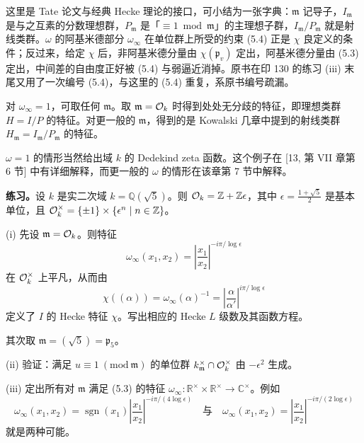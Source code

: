\begin{annote}
这里是 Tate 论文与经典 Hecke 理论的接口，可小结为一张字典：$\mathfrak m$ 记导子，$I_{\mathfrak m}$ 是与之互素的分数理想群，$P_{\mathfrak m}$ 是「$\equiv1\bmod\mathfrak m$」的主理想子群，$I_{\mathfrak m}/P_{\mathfrak m}$ 就是射线类群。$\omega$ 的阿基米德部分 $\omega_\infty$ 在单位群上所受的约束 (5.4) 正是 $\chi$ 良定义的条件；反过来，给定 $\chi$ 后，非阿基米德分量由 $\chi(\mathfrak p_v)$ 定出，阿基米德分量由 (5.3) 定出，中间差的自由度正好被 (5.4) 与弱逼近消掉。原书在印 130 的练习 (iii) 末尾又用了一次编号 (5.4)，与这里的 (5.4) 重复，系原书编号疏漏。
\par\vspace{0.15em}{\raggedleft 【来源：Tate 论文 §3；Cassels--Fr\"ohlich 第 VII 章；Kowalski 本书第 2 章 [8]（A）】\par}
\end{annote}

对 $\omega_\infty=1$，可取任何 $\mathfrak m$。取 $\mathfrak m=\mathcal{O}_k$ 时得到处处无分歧的特征，即理想类群 $H=I/P$ 的特征。对更一般的 $\mathfrak m$，得到的是 Kowalski 几章中提到的射线类群 $H_{\mathfrak m}=I_{\mathfrak m}/P_{\mathfrak m}$ 的特征。

$\omega=1$ 的情形当然给出域 $k$ 的 Dedekind zeta 函数。这个例子在 [13, 第 VII 章第 6 节] 中有详细解释，而更一般的 $\omega$ 的情形在该章第 7 节中解释。

\medskip\noindent\textbf{练习。}\quad 设 $k$ 是实二次域 $k=\mathbb Q(\sqrt5)$。则 $\mathcal{O}_k=\mathbb Z+\mathbb Z\epsilon$，其中 $\epsilon=\frac{1+\sqrt5}{2}$ 是基本单位，且 $\mathcal{O}_k^\times=\{\pm1\}\times\{\epsilon^n\mid n\in\mathbb Z\}$。

(i) 先设 $\mathfrak m=\mathcal{O}_k$。则特征
\[
\omega_\infty(x_1,x_2)=\left|\frac{x_1}{x_2}\right|^{-i\pi/\log\epsilon}
\]
在 $\mathcal{O}_k^\times$ 上平凡，从而由
\[
\chi((\alpha))=\omega_\infty(\alpha)^{-1}=\left|\frac{\alpha}{\alpha'}\right|^{i\pi/\log\epsilon}
\]
定义了 $I$ 的 Hecke 特征 $\chi$。写出相应的 Hecke $L$ 级数及其函数方程。

其次取 $\mathfrak m=(\sqrt5)=\mathfrak p_5$。

(ii) 验证：满足 $u\equiv1\ (\mathrm{mod}\ \mathfrak m)$ 的单位群 $k^\times_{\mathfrak m}\cap\mathcal{O}_k^\times$ 由 $-\epsilon^2$ 生成。

(iii) 定出所有对 $\mathfrak m$ 满足 (5.3) 的特征 $\omega_\infty:\mathbb R^\times\times\mathbb R^\times\to\mathbb C^\times$。例如
\begin{equation*}\tag{5.4}
\omega_\infty(x_1,x_2)=\operatorname{sgn}(x_1)\left|\frac{x_1}{x_2}\right|^{-i\pi/(4\log\epsilon)}
\quad\text{与}\quad
\omega_\infty(x_1,x_2)=\left|\frac{x_1}{x_2}\right|^{-i\pi/(2\log\epsilon)}
\end{equation*}
就是两种可能。

